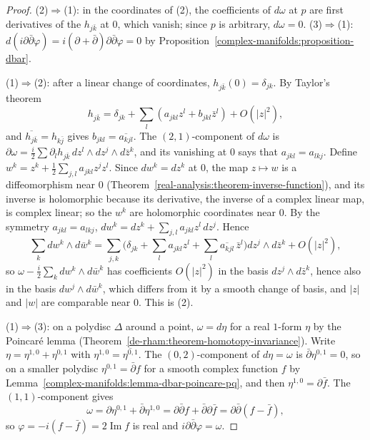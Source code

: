 \begin{proof}
(2)$\Rightarrow$(1): in the coordinates of (2), the coefficients of $d\omega$ at $p$ are first derivatives of the $h_{j\bar k}$ at $0$, which
vanish; since $p$ is arbitrary, $d\omega = 0$. (3)$\Rightarrow$(1): $d(i\partial\bar\partial\varphi) = i(\partial + \bar\partial)\partial\bar\partial\varphi = 0$ by
Proposition~\ref{complex-manifolds:proposition-dbar}.

(1)$\Rightarrow$(2): after a linear change of coordinates, $h_{j\bar k}(0) = \delta_{jk}$. By Taylor's theorem
\[
h_{j\bar k} = \delta_{jk} + \sum_l\left(a_{jkl}z^l + b_{jkl}\bar z^l\right) + O(|z|^2),
\]
and $\overline{h_{j\bar k}} = h_{k\bar j}$ gives $b_{jkl} = \overline{a_{kjl}}$. The $(2,1)$-component of $d\omega$ is
$\partial\omega = \frac{i}{2}\sum\partial_lh_{j\bar k}\,dz^l \wedge dz^j \wedge d\bar z^k$, and its vanishing at $0$ says that
$a_{jkl} = a_{lkj}$. Define $w^k = z^k + \frac12\sum_{j,l}a_{jkl}z^jz^l$. Since $dw^k = dz^k$ at $0$, the map $z \mapsto w$ is a diffeomorphism near $0$
(Theorem~\ref{real-analysis:theorem-inverse-function}), and its inverse is holomorphic because its derivative, the inverse of a complex
linear map, is complex linear; so the $w^k$ are holomorphic coordinates near $0$. By the symmetry $a_{jkl} = a_{lkj}$,
$dw^k = dz^k + \sum_{j,l}a_{jkl}z^l\,dz^j$. Hence
\[
\sum_kdw^k \wedge d\bar w^k = \sum_{j,k}\Big(\delta_{jk} + \sum_la_{jkl}z^l + \sum_l\overline{a_{kjl}}\,\bar z^l\Big)dz^j \wedge d\bar z^k + O(|z|^2),
\]
so $\omega - \frac{i}{2}\sum_kdw^k \wedge d\bar w^k$ has coefficients $O(|z|^2)$ in the basis $dz^j \wedge d\bar z^k$, hence also in the
basis $dw^j \wedge d\bar w^k$, which differs from it by a smooth change of basis, and $|z|$ and $|w|$ are comparable near $0$. This is (2).

(1)$\Rightarrow$(3): on a polydisc $\Delta$ around a point, $\omega = d\eta$ for a real $1$-form $\eta$ by the Poincar\'e lemma
(Theorem~\ref{de-rham:theorem-homotopy-invariance}). Write $\eta = \eta^{1,0} + \eta^{0,1}$ with $\eta^{1,0} = \overline{\eta^{0,1}}$.
The $(0,2)$-component of $d\eta = \omega$ is $\bar\partial\eta^{0,1} = 0$, so on a smaller polydisc $\eta^{0,1} = \bar\partial f$ for a
smooth complex function $f$ by Lemma~\ref{complex-manifolds:lemma-dbar-poincare-pq}, and then $\eta^{1,0} = \partial\bar f$. The $(1,1)$-component
gives
\[
\omega = \partial\eta^{0,1} + \bar\partial\eta^{1,0} = \partial\bar\partial f + \bar\partial\partial\bar f = \partial\bar\partial(f - \bar f),
\]
so $\varphi = -i(f - \bar f) = 2\operatorname{Im}f$ is real and $i\partial\bar\partial\varphi = \omega$.
\end{proof}

